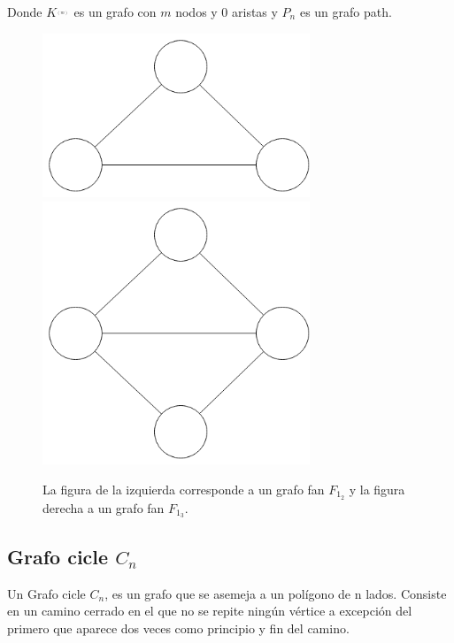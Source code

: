 Donde $K ^ __ (m)$ es un grafo con $m$ nodos y 0 aristas y $P_n$ es un grafo path.

\begin{figure}[H]
\includegraphics[width=80mm]{F1_2.png}
\includegraphics[width=80mm]{F1_3.png}
\caption{La figura de la izquierda corresponde a un grafo fan $F_1_2$ y la figura derecha a un grafo fan $F_1_3$.}
\label{overflow}
\end{figure}

\subsection{Grafo cicle $C_n$}
Un Grafo cicle $C_n$, es un grafo que se asemeja a un polígono de n lados. Consiste en un camino cerrado en el que no se repite ningún vértice a excepción del primero que aparece dos veces como principio y fin del camino. 

